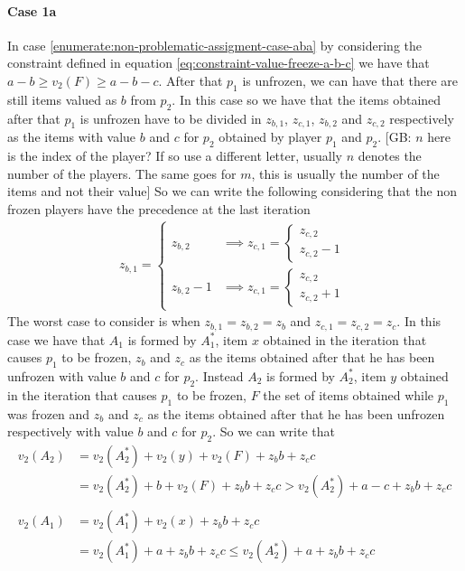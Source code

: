 \documentclass{article}
\newcommand{\gb}[1]{{\color{red}[GB: #1]}}
\begin{document}
\paragraph{Case 1a}
In case \ref{enumerate:non-problematic-assigment-case-aba} by considering the constraint defined in equation \ref{eq:constraint-value-freeze-a-b-c} we have that $a-b\ge v_2(F)\ge a-b-c$. After that $p_1$ is unfrozen, we can have that there are still items valued as $b$ from $p_2$. In this case so we have that the items obtained after that $p_1$ is unfrozen have to be divided in $z_{b, 1}$, $z_{c, 1}$, $z_{b, 2}$ and  $z_{c, 2}$ respectively as the items with value $b$ and $c$ for $p_2$ obtained by player $p_1$ and $p_2$.
\gb{$n$ here is the index of the player? If so use a different letter, usually $n$ denotes the number of the players. The same goes for $m$, this is usually the number of the items and not their value} So we can write the following considering that the non frozen players have the precedence at the last iteration
\begin{align*}
z_{b,1} = \begin{cases} 
z_{b,2} &\implies z_{c,1} = \begin{cases} 
z_{c,2}\\
z_{c,2} -1
\end{cases}   \\
z_{b,2} -1 &\implies z_{c,1} = \begin{cases} 
z_{c,2}\\
z_{c,2} +1
\end{cases}   
\end{cases}
\end{align*}
The worst case to consider is when $z_{b,1} = z_{b,2} = z_b$ and $z_{c,1} = z_{c,2} = z_c$. In this case we have that $A_1$ is formed by $A_1^*$, item $x$ obtained in the iteration that causes $p_1$ to be frozen, $z_b$ and $z_c$ as the items obtained after that he has been unfrozen with value $b$ and $c$ for $p_2$. Instead $A_2$ is formed by $A_2^*$, item $y$ obtained in the iteration that causes $p_1$ to be frozen, $F$ the set of items obtained while $p_1$ was frozen and $z_b$ and $z_c$ as the items obtained after that he has been unfrozen respectively with value $b$ and $c$ for $p_2$. So we can write that 
\begin{align*}
    v_2(A_2) &= v_2(A_2^*) + v_2(y) + v_2(F) + z_b b + z_cc\\
    &= v_2(A_2^*) + b + v_2(F) + z_bb +  z_cc > v_2(A_2^*) + a-c + z_b b + z_cc\\\\
    v_2(A_1) &= v_2(A_1^*) + v_2(x) + z_bb + z_cc \\
    &=v_2(A_1^*) + a + z_bb + z_cc\le v_2(A_2^*) + a + z_bb + z_cc
\end{align*}
\end{document}
